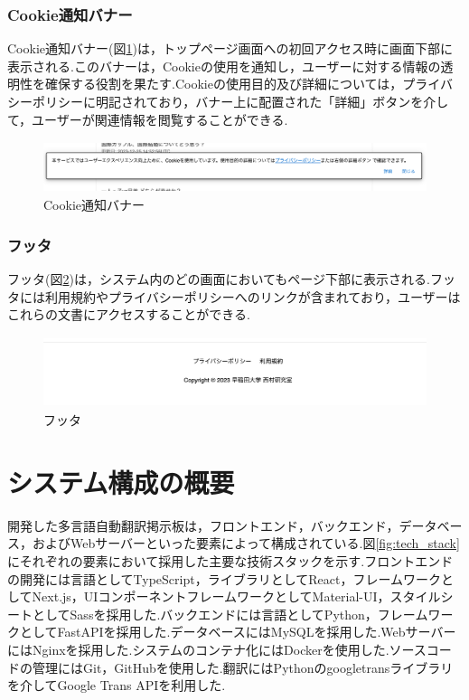 \documentclass[b5paper,12pt,dvipdfmx]{jsreport}
\begin{document}
\subsubsection{Cookie通知バナー}
Cookie通知バナー(図\ref{fig:cookie_banner})は，トップページ画面への初回アクセス時に画面下部に表示される.このバナーは，Cookieの使用を通知し，ユーザーに対する情報の透明性を確保する役割を果たす.Cookieの使用目的及び詳細については，プライバシーポリシーに明記されており，バナー上に配置された「詳細」ボタンを介して，ユーザーが関連情報を閲覧することができる.

\begin{figure}[H]
	\centering
    \includegraphics[width=120mm,height=14.94mm]{./img/feature/cookie_banner.png}
	\caption{Cookie通知バナー}
	\label{fig:cookie_banner}
\end{figure}


\subsubsection{フッタ}
フッタ(図\ref{fig:footer})は，システム内のどの画面においてもページ下部に表示される.フッタには利用規約やプライバシーポリシーへのリンクが含まれており，ユーザーはこれらの文書にアクセスすることができる.

\begin{figure}[H]
	\centering
    \includegraphics[width=120mm,height=20.80mm]{./img/feature/footer.png}
	\caption{フッタ}
	\label{fig:footer}
\end{figure}



\section{システム構成の概要}
開発した多言語自動翻訳掲示板は，フロントエンド，バックエンド，データベース，およびWebサーバーといった要素によって構成されている.図\ref{fig:tech_stack}にそれぞれの要素において採用した主要な技術スタックを示す.フロントエンドの開発には言語としてTypeScript，ライブラリとしてReact，フレームワークとしてNext.js，UIコンポーネントフレームワークとしてMaterial-UI，スタイルシートとしてSassを採用した.バックエンドには言語としてPython，フレームワークとしてFastAPIを採用した.データベースにはMySQLを採用した.WebサーバーにはNginxを採用した.システムのコンテナ化にはDockerを使用した.ソースコードの管理にはGit，GitHubを使用した.翻訳にはPythonのgoogletransライブラリを介してGoogle Trans APIを利用した.
\end{document}
